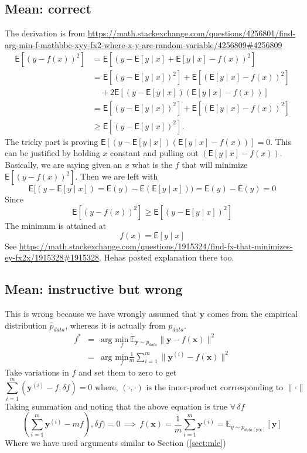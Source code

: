 \documentclass{article}
\newcommand{\beq}{\begin{equation}}
\newcommand{\eeq}{\end{equation}}
\newcommand{\ber}{\begin{eqnarray}}
\newcommand{\eer}{\end{eqnarray}}
\begin{document}
\subsection{Mean: correct}
The derivation is from \url{https://math.stackexchange.com/questions/4256801/find-arg-min-f-mathbbe-xyy-fx2-where-x-y-are-random-variable/4256809#4256809}
\begin{align}
\mathsf{E}[(y-f(x))^2]&=\mathsf{E}[(y-\mathsf{E}[y\mid x]+\mathsf{E}[y\mid x]-f(x))^2] \\
&=\mathsf{E}[(y-\mathsf{E}[y\mid x])^2]+\mathsf{E}[(\mathsf{E}[y\mid x]-f(x))^2] \\
&\quad+2\mathsf{E}[(y-\mathsf{E}[y\mid x])(\mathsf{E}[y\mid x]-f(x))] \\
&=\mathsf{E}[(y-\mathsf{E}[y\mid x])^2]+\mathsf{E}[(\mathsf{E}[y\mid x]-f(x))^2] \\
&\ge \mathsf{E}[(y-\mathsf{E}[y\mid x])^2]. 
\end{align}
The tricky part is proving $\mathsf{E}[(y-\mathsf{E}[y\mid x])(\mathsf{E}[y\mid x]-f(x))]=0$. This can be justified by holding $x$ constant and pulling out $(\mathsf{E}[y\mid x]-f(x))$. Basically, we are saying given an $x$ what is the $f$ that will minimize $\mathsf{E}[(y-f(x))^2]$. Then we are left with
\beq
\mathsf{E}[(y-\mathsf{E}[y\mid x]) = \mathsf{E}(y) - \mathsf{E}(\mathsf{E}[y\mid x])) = \mathsf{E}(y) - \mathsf{E}(y) = 0
\eeq
Since
\beq
\mathsf{E}[(y-f(x))^2] \ge \mathsf{E}[(y-\mathsf{E}[y\mid x])^2]
\eeq
The minimum is attained at
\beq
f(x) = \mathsf{E}[y\mid x]
\eeq
See \url{https://math.stackexchange.com/questions/1915324/find-fx-that-minimizes-ey-fx2x/1915328#1915328}. Hehas posted explanation there too.  
\subsection{Mean: instructive but wrong}
This is wrong because we have wrongly assumed that $\pmb{y}$ comes from the empirical distribution $\hat{p}_{data}$, whereas it is actually from $p_{data}$.
\ber
f^{*} &=& \text{arg } \underset{f}{\text{min}}\, {\mathbb{E}}_{\pmb{y}\sim{p_{data}}}\|{\pmb{y}}-f(\pmb{x})\|^2 \\
     &=& \text{arg } \underset{f}{\text{min}} \frac{1}{m}\sum_{i=1}^{m}\|{\pmb{y}^{(i)}}-f(\pmb{x})\|^2
\eer
Take variations in $f$ and set them to zero to get
\beq
\sum_{i=1}^{m}(\pmb{y}^{(i)}-f,\delta{f}) = 0 \text{ where, } (\cdot,\cdot) \text{ is the inner-product corrresponding to }\|\cdot\|
\eeq
Taking summation and noting that the above equation is true $\forall\,\delta{f}$
\beq
(\sum_{i=1}^{m}\pmb{y}^{(i)}-mf),\delta{f}) = 0 \, \implies\,f(\pmb{x})=\frac{1}{m}\sum_{i=1}^{m}\pmb{y}^{(i)} = \mathbb{E}_{y\sim{p_{data(\pmb{y}|\pmb{x})}}}[\pmb{y}]
\eeq
Where we have used arguments similar to Section (\ref{sect:mle})
\end{document}
